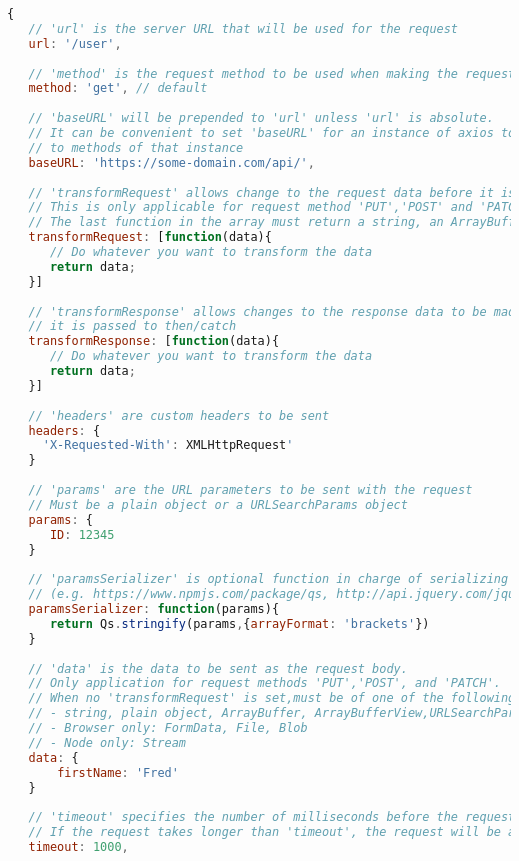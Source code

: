 \begin{lstlisting}[language=JavaScript]
{
   // 'url' is the server URL that will be used for the request
   url: '/user',
   
   // 'method' is the request method to be used when making the request
   method: 'get', // default
   
   // 'baseURL' will be prepended to 'url' unless 'url' is absolute.
   // It can be convenient to set 'baseURL' for an instance of axios to pass relative URLs
   // to methods of that instance
   baseURL: 'https://some-domain.com/api/',
   
   // 'transformRequest' allows change to the request data before it is sent to the server
   // This is only applicable for request method 'PUT','POST' and 'PATCH'.
   // The last function in the array must return a string, an ArrayBuffer, or a Stream
   transformRequest: [function(data){
      // Do whatever you want to transform the data
      return data;
   }]
   
   // 'transformResponse' allows changes to the response data to be made before 
   // it is passed to then/catch
   transformResponse: [function(data){
      // Do whatever you want to transform the data
      return data;
   }]
   
   // 'headers' are custom headers to be sent
   headers: {
     'X-Requested-With': XMLHttpRequest'
   }
   
   // 'params' are the URL parameters to be sent with the request
   // Must be a plain object or a URLSearchParams object
   params: {
      ID: 12345
   }
   
   // 'paramsSerializer' is optional function in charge of serializing 'params'
   // (e.g. https://www.npmjs.com/package/qs, http://api.jquery.com/jquery.param/)
   paramsSerializer: function(params){
      return Qs.stringify(params,{arrayFormat: 'brackets'})
   }
   
   // 'data' is the data to be sent as the request body.
   // Only application for request methods 'PUT','POST', and 'PATCH'.
   // When no 'transformRequest' is set,must be of one of the following type:
   // - string, plain object, ArrayBuffer, ArrayBufferView,URLSearchParams
   // - Browser only: FormData, File, Blob
   // - Node only: Stream
   data: {
       firstName: 'Fred'
   }
   
   // 'timeout' specifies the number of milliseconds before the request times out.
   // If the request takes longer than 'timeout', the request will be aborted.
   timeout: 1000,
   

\end{lstlisting}
